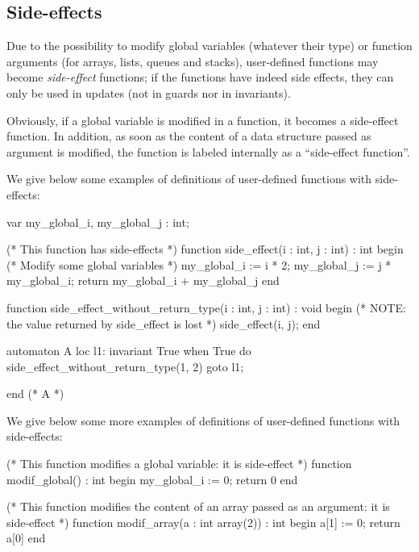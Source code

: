 \subsection{Side-effects}

Due to the possibility to modify global variables (whatever their type) or function arguments (for arrays, lists, queues and stacks), user-defined functions may become \emph{side-effect} functions; if the functions have indeed side effects, they can only be used in updates (not in guards nor in invariants).

Obviously, if a global variable is modified in a function, it becomes a side-effect function.
In addition, as soon as the content of a data structure passed as argument is modified, the function is labeled internally as a ``side-effect function''.





\begin{example}\label{example:functions-side-effects-void}
We give below some examples of definitions of user-defined functions with side-effects:

\begin{IMITATORmodel}
var
	my_global_i, my_global_j : int;

(* This function has side-effects *)
function side_effect(i : int, j : int) : int
begin
	(* Modify some global variables *)
	my_global_i := i * 2;
	my_global_j := j * my_global_i;
	return my_global_i + my_global_j
end

function side_effect_without_return_type(i : int, j : int) : void
begin
	(* NOTE: the value returned by side_effect is lost *)
	side_effect(i, j);
end

automaton A
loc l1: invariant True
	when True do {side_effect_without_return_type(1, 2)} goto l1;

end (* A *)
\end{IMITATORmodel}
\end{example}


\begin{example}
We give below some more examples of definitions of user-defined functions with side-effects:

\begin{IMITATORmodel}
(* This function modifies a global variable: it is side-effect *)
function modif_global() : int
begin
	my_global_i := 0;
	return 0
end

(* This function modifies the content of an array passed as an argument: it is side-effect  *)
function modif_array(a : int array(2)) : int
begin
	a[1] := 0;
	return a[0]
end
\end{IMITATORmodel}
\end{example}


